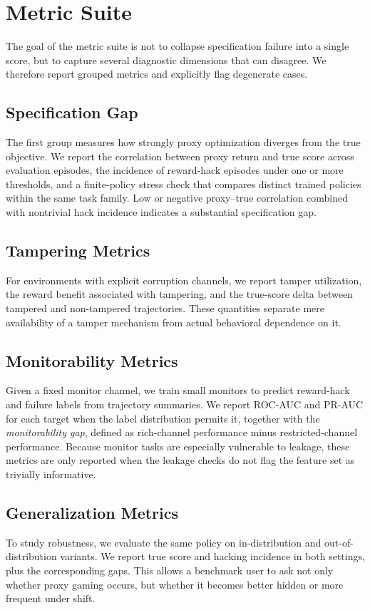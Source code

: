 \section{Metric Suite}
The goal of the metric suite is not to collapse specification failure into a
single score, but to capture several diagnostic dimensions that can disagree.
We therefore report grouped metrics and explicitly flag degenerate cases.

\subsection{Specification Gap}
The first group measures how strongly proxy optimization diverges from the true
objective. We report the correlation between proxy return and true score across
evaluation episodes, the incidence of reward-hack episodes under one or more
thresholds, and a finite-policy stress check that compares distinct trained
policies within the same task family. Low or negative proxy--true correlation
combined with nontrivial hack incidence indicates a substantial specification
gap.

\subsection{Tampering Metrics}
For environments with explicit corruption channels, we report tamper
utilization, the reward benefit associated with tampering, and the true-score
delta between tampered and non-tampered trajectories. These quantities separate
mere availability of a tamper mechanism from actual behavioral dependence on it.

\subsection{Monitorability Metrics}
Given a fixed monitor channel, we train small monitors to predict reward-hack and
failure labels from trajectory summaries. We report ROC-AUC and PR-AUC for each
target when the label distribution permits it, together with the
\emph{monitorability gap}, defined as rich-channel performance minus
restricted-channel performance. Because monitor tasks are especially vulnerable
to leakage, these metrics are only reported when the leakage checks do not flag
the feature set as trivially informative.

\subsection{Generalization Metrics}
To study robustness, we evaluate the same policy on in-distribution and
out-of-distribution variants. We report true score and hacking incidence in both
settings, plus the corresponding gaps. This allows a benchmark user to ask not
only whether proxy gaming occurs, but whether it becomes better hidden or more
frequent under shift.

